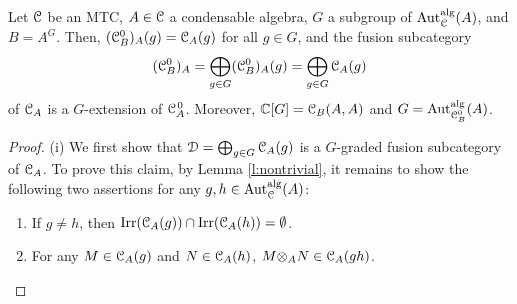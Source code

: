 \documentclass{amsart}
\begin{document}
\begin{thm}\label{t2}
    Let ${\EuScript{C}}$ be an MTC, $A \in {\EuScript{C}}$ a condensable algebra, $G$ a subgroup of ${\operatorname{Aut}_{\EuScript{C}}^{\operatorname{alg}}}(A)$, and $B=A^G$. Then, $({{\EuScript{C}}_B^0})_A(g) = {{\EuScript{C}}_A}(g)$ for all $g \in G$, and the fusion subcategory 
    $$
    ({{\EuScript{C}}_B^0})_A = \bigoplus_{g \in G} ({{\EuScript{C}}_B^0})_A(g)=\bigoplus_{g \in G} {{\EuScript{C}}_A}(g)
    $$
    of ${{\EuScript{C}}_A}$ is a $G$-extension of ${{\EuScript{C}}_A^{\hspace{1pt}0}}$. Moreover, $\mathbb{C} [G] = {{\EuScript{C}}_B}(A,A)$ and $G={\rm Aut}_{{{\EuScript{C}}_B^0}}^{\operatorname{alg}}(A)$. 
\end{thm}
\begin{proof} (i) We first show that ${\EuScript{D}} =\bigoplus_{g \in G} {{\EuScript{C}}_A}(g)$ is a $G$-graded fusion subcategory of ${{\EuScript{C}}_A}$.
To prove this claim, by Lemma \ref{l:nontrivial}, it remains to show the following two assertions for any  $g, h \in {\operatorname{Aut}_{\EuScript{C}}^{\operatorname{alg}}}(A)$:
\begin{enumerate}    
 \item[(a)] If $g \ne h$, then $\operatorname{Irr}({{\EuScript{C}}_A}(g)) \cap \operatorname{Irr}({{\EuScript{C}}_A}(h)) =\emptyset$.
\item[(b)] For any $M \in {{\EuScript{C}}_A}(g)$ and $N \in {{\EuScript{C}}_A}(h)$, $M {\otimes}_A N \in {{\EuScript{C}}_A}(gh)$.
\end{enumerate} 


\end{proof}
\end{document}
